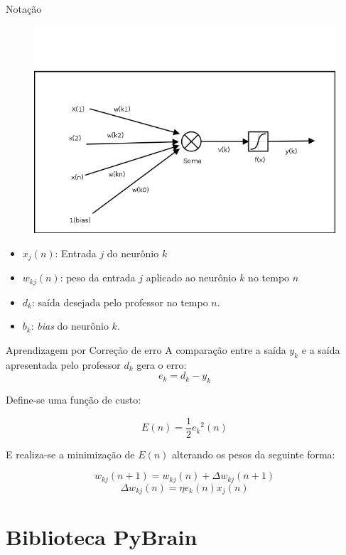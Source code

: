 \documentclass{beamer}
\begin{document}
      \begin{frame}{Notação}    
	\begin{figure}[htpb]
	  \includegraphics[scale=0.35]{cell.png}
	\end{figure}
    
	\begin{itemize}
	  \item $x_j(n)$: Entrada $j$ do neurônio $k$
	  \item $w_{kj}(n)$: peso da entrada $j$ aplicado ao neurônio $k$ no tempo $n$
	  \item $d_k$: saída desejada pelo professor no tempo $n$.
	  \item $b_k$: \textit{bias} do neurônio $k$.
	\end{itemize}
      \end{frame}
      
      \begin{frame}{Aprendizagem por Correção de erro}
	A comparação entre a saída $y_k$ e a saída apresentada pelo professor $d_k$ gera o erro:
	$$e_k = d_k - y_k$$
  
	Define-se uma função de custo:
  
	$$E(n)= \frac{1}{2} {e_k}^2(n)$$
  
	E realiza-se a minimização de $E(n)$ alterando os pesos da seguinte forma:
  
	$$w_{kj}(n+1) = w_{kj}(n) + \Delta w_{kj}(n+1) $$
	$$\Delta w_{kj}(n) = \eta {e_k}(n)  x_j(n)$$
    
      \end{frame}
  \section{Biblioteca PyBrain}
    \frame{\sectionpage}
    
\end{document}
